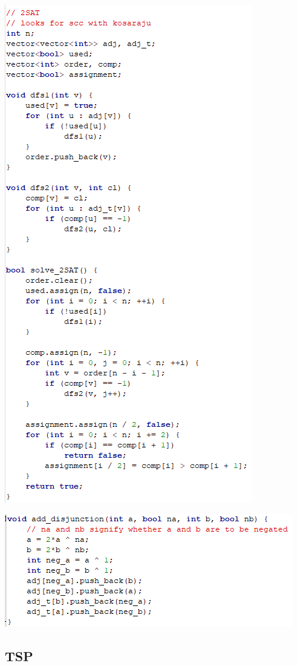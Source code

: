 \documentclass[11pt,twocolumn]{article}
\begin{document}
\includegraphics[scale=0.8]{2sata}

\includegraphics[scale=0.8]{2satb}
\subsection{TSP}
\end{document}
